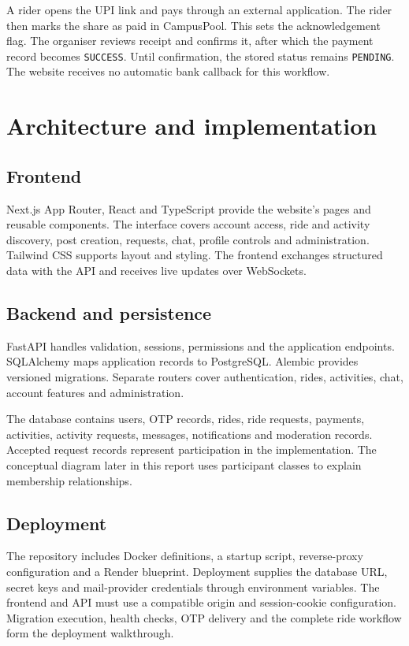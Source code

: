 \documentclass[11pt,a4paper]{article}
\begin{document}
A rider opens the UPI link and pays through an external application. The rider then marks the share as paid in CampusPool. This sets the acknowledgement flag. The organiser reviews receipt and confirms it, after which the payment record becomes \texttt{SUCCESS}. Until confirmation, the stored status remains \texttt{PENDING}. The website receives no automatic bank callback for this workflow.

\section{Architecture and implementation}
\subsection{Frontend}
Next.js App Router, React and TypeScript provide the website's pages and reusable components. The interface covers account access, ride and activity discovery, post creation, requests, chat, profile controls and administration. Tailwind CSS supports layout and styling. The frontend exchanges structured data with the API and receives live updates over WebSockets.

\subsection{Backend and persistence}
FastAPI handles validation, sessions, permissions and the application endpoints. SQLAlchemy maps application records to PostgreSQL. Alembic provides versioned migrations. Separate routers cover authentication, rides, activities, chat, account features and administration.

The database contains users, OTP records, rides, ride requests, payments, activities, activity requests, messages, notifications and moderation records. Accepted request records represent participation in the implementation. The conceptual diagram later in this report uses participant classes to explain membership relationships.

\subsection{Deployment}
The repository includes Docker definitions, a startup script, reverse-proxy configuration and a Render blueprint. Deployment supplies the database URL, secret keys and mail-provider credentials through environment variables. The frontend and API must use a compatible origin and session-cookie configuration. Migration execution, health checks, OTP delivery and the complete ride workflow form the deployment walkthrough.
\end{document}
